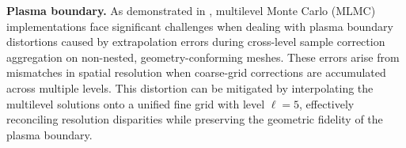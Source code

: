 %
\begin{table}[ht]
\centering
{}
\caption{The offline cost. The second row--CPU time to construct surrogate $\widehat u_{h,k}$ with sparse grid level $q=1$ with respect to decreasing tolerance. The third row corresponds to the total time to estimate the parameters with 500 samples, this cost includes evaluation of surrogate and direct computation, interpolation to solution to the common fine mesh, and use Welford's algorithm to compute the sample statistics.}
\label{Tab:Offline_cost}
\end{table}
%




\noindent \textbf{Plasma boundary.} 
As demonstrated in \cite{ElLiSa:2023}, multilevel Monte Carlo (MLMC) implementations face significant challenges when dealing with plasma boundary distortions caused by extrapolation errors during cross-level sample correction aggregation on non-nested, geometry-conforming meshes. These errors arise from mismatches in spatial resolution when coarse-grid corrections are accumulated across multiple levels. This distortion can be mitigated by interpolating the multilevel solutions onto a unified fine grid with level $\ell=5$, effectively reconciling resolution disparities while preserving the geometric fidelity of the plasma boundary.






